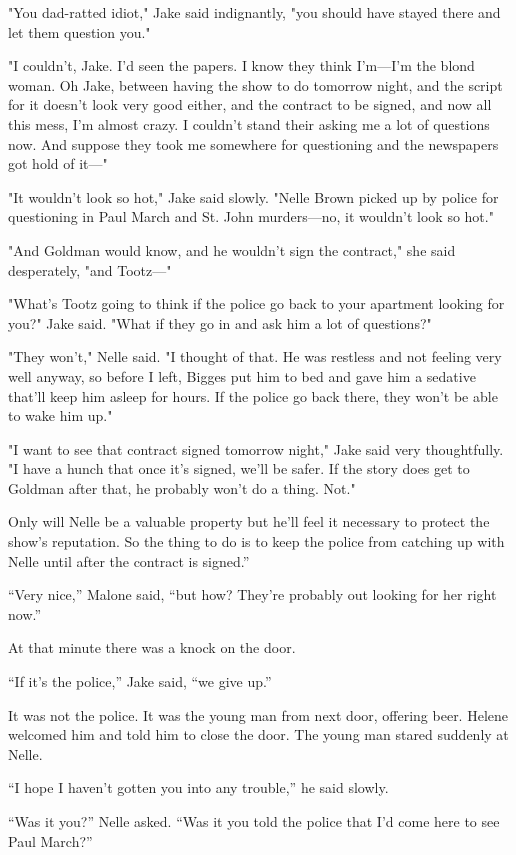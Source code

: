 \documentclass{novel}
\begin{document}
"You dad-ratted idiot," Jake said indignantly, "you should have stayed there and let them question you."

"I couldn’t, Jake. I’d seen the papers. I know they think I’m—I’m the blond woman. Oh Jake, between having the show to do tomorrow night, and the script for it doesn’t look very good either, and the contract to be signed, and now all this mess, I’m almost crazy. I couldn’t stand their asking me a lot of questions now. And suppose they took me somewhere for questioning and the newspapers got hold of it—"

"It wouldn’t look so hot," Jake said slowly. "Nelle Brown picked up by police for questioning in Paul March and St. John murders—no, it wouldn’t look so hot."

"And Goldman would know, and he wouldn’t sign the contract," she said desperately, "and Tootz—"

"What’s Tootz going to think if the police go back to your apartment looking for you?" Jake said. "What if they go in and ask him a lot of questions?"

"They won’t," Nelle said. "I thought of that. He was restless and not feeling very well anyway, so before I left, Bigges put him to bed and gave him a sedative that’ll keep him asleep for hours. If the police go back there, they won’t be able to wake him up."

"I want to see that contract signed tomorrow night," Jake said very thoughtfully. "I have a hunch that once it’s signed, we’ll be safer. If the story does get to Goldman after that, he probably won’t do a thing. Not."

Only will Nelle be a valuable property but he’ll feel it necessary to protect the show’s reputation. So the thing to do is to keep the police from catching up with Nelle until after the contract is signed.”

“Very nice,” Malone said, “but how? They’re probably out looking for her right now.”

At that minute there was a knock on the door.

“If it’s the police,” Jake said, “we give up.”

It was not the police. It was the young man from next door, offering beer. Helene welcomed him and told him to close the door. The young man stared suddenly at Nelle.

“I hope I haven’t gotten you into any trouble,” he said slowly.

“Was it you?” Nelle asked. “Was it you told the police that I’d come here to see Paul March?”
\end{document}
